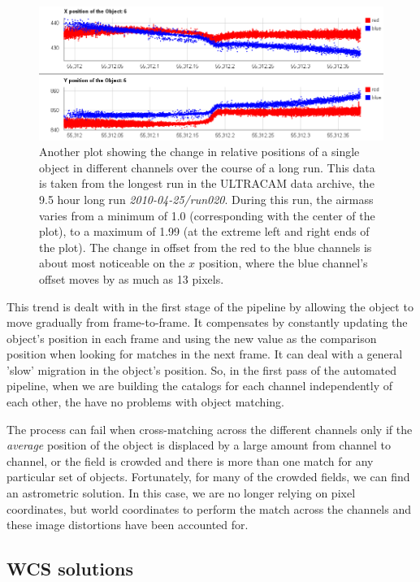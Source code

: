 \begin{figure}
  \centering
  \includegraphics[width=140mm]{images/position_drift_longrun.png}
  \caption{Another plot showing the change in relative positions of a single object in different channels over the course of a long run. This data is taken from the longest run in the ULTRACAM data archive, the 9.5 hour long run \emph{2010-04-25/run020}. During this run, the airmass varies from a minimum of 1.0 (corresponding with the center of the plot), to a maximum of 1.99 (at the extreme left and right ends of the plot). The change in offset from the red to the blue channels is about most noticeable on the $x$ position, where the blue channel's offset moves by as much as 13 pixels. }
\label{fig:positiondriftlongrun}
\end{figure}

This trend is dealt with in the first stage of the pipeline by allowing the object to move gradually from frame-to-frame. It compensates by  constantly updating the object's position in each frame and using the new value as the comparison position when looking for matches in the next frame. It can deal with a general 'slow' migration in the object's position. So, in the first pass of the automated pipeline, when we are building the catalogs for each channel independently of each other, the have no problems with object matching. 

The process can fail when cross-matching across the different channels only if the \emph{average} position of the object is displaced by a large amount from channel to channel, or the field is crowded and there is more than one match for any particular set of objects. Fortunately, for many of the crowded fields, we can find an astrometric solution. In this case, we are no longer relying on pixel coordinates, but world coordinates to perform the match across the channels and these image distortions have been accounted for. 

\subsection{WCS solutions}\label{sect:astrometry}


